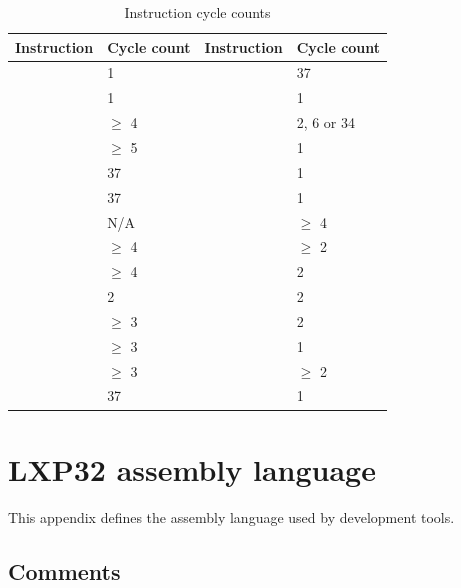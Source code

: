 \documentclass[a4paper,12pt,twoside,extrafontsizes]{memoir}
\begin{document}
\begin{table}[htbp]
	\centering
	\caption{Instruction cycle counts}
	\label{tab:cycles}
	\begin{tabularx}{0.8\textwidth}{LLLL}
		\toprule
		Instruction & Cycle count & Instruction & Cycle count \\
		\midrule
		 & 1 &  & 37 \\
		 & 1 &  & 1 \\
		 & $\ge$ 4\footnotemark[1] &  & 2, 6 or 34\footnotemark[3] \\
		 & $\ge$ 5\footnotemark[1] &  & 1 \\
		 & 37 &  & 1 \\
		 & 37 &  & 1 \\
		 & N/A &  & $\ge$ 4\footnotemark[1] \\
		 & $\ge$ 4\footnotemark[1] &  & $\ge$ 2\footnotemark[2] \\
		 & $\ge$ 4\footnotemark[1] &  & 2 \\
		 & 2 &  & 2 \\
		 & $\ge$ 3\footnotemark[2] &  & 2 \\
		 & $\ge$ 3\footnotemark[2] &  & 1 \\
		 & $\ge$ 3\footnotemark[2] &  & $\ge$ 2\footnotemark[2] \\
		 & 37 &  & 1 \\
		\bottomrule
	\end{tabularx}
\end{table}


\chapter{LXP32 assembly language}
\label{app:assemblylanguage}

This appendix defines the assembly language used by \lxp{} development tools.

\section{Comments}
\end{document}
